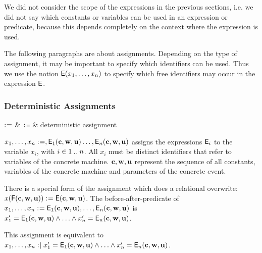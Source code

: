 We did not consider the scope of the expressions in the previous sections, i.e. we did not say which constants or variables can be used in an expression or predicate, because
this depends completely on the context where the expression is used.

The following paragraphs are about assignments. Depending on the type of assignment, it
may be important to specify which identifiers can be used.
Thus we use the notion $\textsf{E}(x_1,\ldots,x_n)$ to specify which free identifiers may occur
in the expression $\textsf{E}$.

\newcommand{\eventbassignmentexpr}[1]{\expre_{#1}(\allconstants,\concvariables,\concparameters)}

\begin{samepage}
\subsubsection{Deterministic Assignments}
\label{deterministic_assignments}
\begin{rrnames}
  $\mathrel{:\mkern1mu=}$ & \texttt{:=} & deterministic assignment
\end{rrnames}
\begin{rodinrefentry}
  \rrdesc
    $x_1,\ldots,x_n \bcmeq ,\eventbassignmentexpr{1}\ldots,\eventbassignmentexpr{n}$
    assigns the expressions $\textsf{E}_i$ to the variable $x_i$, with $i\in1\mathbin{.\mkern1mu.} n$.
    All $x_i$ must be distinct identifiers that refer to variables of the concrete machine.
    $\mathbf{c},\mathbf{w},\mathbf{u}$ represent the sequence of all constants, 
    variables of the concrete machine and parameters of the concrete event.

    There is a special form of the assignment which does a relational overwrite:\\
    $x(\textsf{F}(\mathbf{c},\mathbf{w},\mathbf{u})) \mathrel{:\mkern1mu=} \textsf{E}(\mathbf{c},\mathbf{w},\mathbf{u})$.
  \rrdef
    The before-after-predicate of $x_1,\ldots,x_n \bcmeq \eventbassignmentexpr{1},\ldots,\eventbassignmentexpr{n}$ is\\ $x_1' = \eventbassignmentexpr{1} \land \ldots \land x_n' = \eventbassignmentexpr{n}$.

    This assignment is equivalent to
    $x_1,\ldots,x_n \bcmsuch x_1' = \eventbassignmentexpr{1} \land \ldots \land x_n' = \eventbassignmentexpr{n}$.


\end{rodinrefentry}
\end{samepage}
